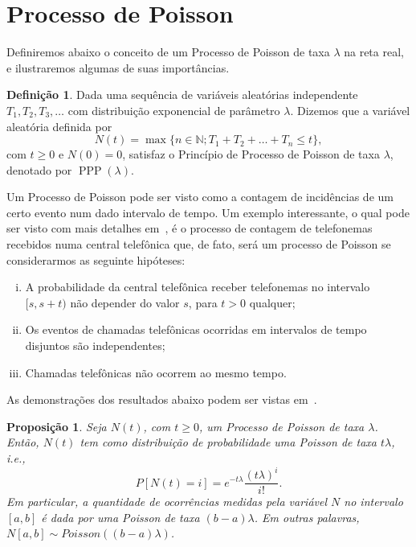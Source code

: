 \documentclass[twoside,openright,titlepage,numbers=noenddot,headinclude,  lineheaders footinclude=true,cleardoublepage=empty,
                                BCOR=5mm,paper=a4,fontsize=12pt ]{scrbook}
\newtheorem{prop}[teo]{Proposição}
\theoremstyle{definition}
\newtheorem{definicao}{Definição}[chapter]
\DeclareMathOperator{\PPP}{PPP}
\begin{document}
\section{Processo de Poisson}
Definiremos abaixo o conceito de um Processo de Poisson de taxa $\lambda$ na reta real, e ilustraremos algumas
de suas importâncias.

\begin{definicao}
Dada uma sequência de variáveis aleatórias independente  $T_1, T_2, T_3, \ldots$ com distribuição
exponencial de parâmetro $\lambda$. Dizemos que a variável aleatória
definida por
\[
N(t)= \max \{ n \in \mathbb{N}; T_1 + T_2 + \ldots + T_n \leq t\},
\]
com $t \geq 0$ e $N(0) = 0$, satisfaz o Princípio de Processo de Poisson de taxa $\lambda$, denotado por $\PPP(\lambda)$.
\end{definicao}

Um Processo de Poisson pode ser visto como a contagem de incidências de um certo evento num dado
intervalo de tempo. Um exemplo interessante, o qual pode ser visto com mais detalhes em~\cite{barry},
é o processo de contagem de telefonemas recebidos numa central telefônica que,
de fato, será um processo de Poisson se considerarmos
as seguinte hipóteses:
\begin{enumerate}[(i)]
\item A probabilidade da central telefônica receber telefonemas no intervalo $[s, s+t)$ não
depender do valor $s$, para $t > 0$ qualquer;
\item Os eventos de chamadas telefônicas ocorridas em intervalos de tempo disjuntos são independentes;
\item Chamadas telefônicas não ocorrem ao mesmo tempo.
\end{enumerate}

As demonstrações dos resultados abaixo podem ser vistas em~\cite{durret1}.

\begin{prop}
Seja $N(t)$, com $t \geq 0$, um Processo de Poisson de taxa $\lambda$. Então,
$N(t)$ tem como distribuição de probabilidade uma Poisson de taxa $t \lambda$, i.e.,
\[
P[ N(t) = i] = e^{-t \lambda} \frac{ (t \lambda)^i}{i!}.
\]
Em particular, a quantidade de ocorrências medidas pela variável $N$ no intervalo $[a,b]$ é dada por uma Poisson
de taxa $(b-a) \lambda$. Em outras palavras, $N[a,b] \sim Poisson( (b-a) \lambda )$.
\end{prop}
\end{document}

